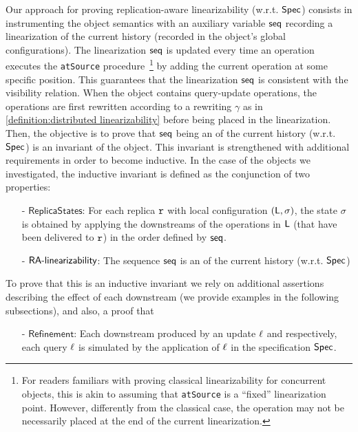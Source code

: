Our approach for proving replication-aware linearizability (w.r.t. $\mathsf{Spec}{}$) consists in instrumenting the object semantics with an auxiliary variable $\mathsf{seq}$ recording a linearization of the current history (recorded in the object's global configurations). 
The linearization $\mathsf{seq}$ is updated every time an operation executes the {\tt atSource} procedure~\footnote{For readers familiars with proving classical linearizability for concurrent objects, this is akin to assuming that {\tt atSource} is a ``fixed'' linearization point. However, differently from the classical case, the operation may not be necessarily placed at the end of the current linearization.} by adding the current operation at some specific position. This guarantees that the linearization $\mathsf{seq}$ is consistent with the visibility relation.
When the object contains query-update operations, the operations are first rewritten according to a rewriting $\gamma$ as in \autoref{definition:distributed linearizability} before being placed in the linearization. 
Then, the objective is to prove that $\mathsf{seq}$ being an \crdtlinearization{} of the current history (w.r.t. $\mathsf{Spec}{}$) is an invariant of the object. This invariant is strengthened with additional requirements in order to become inductive. In the case of the objects we investigated, the inductive invariant is defined as the conjunction of two properties:
\begin{itemize}
\item[-] $\mathsf{ReplicaStates}$: For each replica $\mathtt{r}$ with local configuration $(\mathsf{L},\sigma)$, the state $\sigma$ is obtained by applying the downstreams of the operations in $\mathsf{L}$ (that have been delivered to $\mathtt{r}$) in the order defined by $\mathsf{seq}$.  

\item[-] $\mathsf{RA\text{-}linearizability{}}$: The sequence $\mathsf{seq}$ is an \crdtlinearization{} of the current history (w.r.t. $\mathsf{Spec}{}$) 
\end{itemize}
To prove that this is an inductive invariant we rely on additional assertions describing the effect of each downstream (we provide examples in the following subsections), and also, a proof that 
\begin{itemize}
\item[-] $\mathsf{Refinement}$: Each downstream produced by an update $\ell$ and respectively, each query $\ell$ is simulated by the application of $\ell$ in the specification $\mathsf{Spec}$.
\end{itemize}
